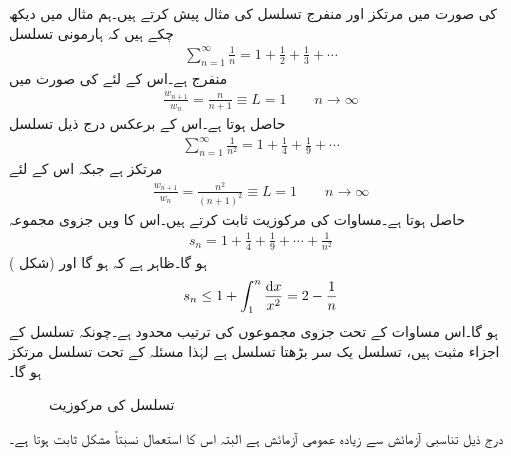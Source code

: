  کی صورت میں مرتکز اور منفرج تسلسل کی مثال پیش کرتے ہیں۔ہم مثال  میں دیکھ چکے ہیں کہ ہارمونی تسلسل 
\begin{align*}
\sum_{n=1}^{\infty} \frac{1}{n}=1+\frac{1}{2}+\frac{1}{3}+\cdots
\end{align*}
منفرج ہے۔اس کے لئے  کی صورت میں
\begin{align*}
\frac{w_{n+1}}{w_n}=\frac{n}{n+1}\equiv L=1 \quad \quad n\to \infty
\end{align*}
حاصل ہوتا ہے۔اس کے برعکس درج ذیل تسلسل
\begin{align}\label{مساوات_ترتیب_تسلسل_مربع_بالعکس}
\sum_{n=1}^{\infty}\frac{1}{n^2}=1+\frac{1}{4}+\frac{1}{9}+\cdots
\end{align}
مرتکز ہے جبکہ اس کے لئے
\begin{align*}
\frac{w_{n+1}}{w_n}=\frac{n^2}{(n+1)^2}\equiv L=1\quad \quad n\to\infty
\end{align*}
حاصل ہوتا ہے۔مساوات  کی مرکوزیت ثابت کرتے ہیں۔اس کا  ویں جزوی مجموعہ
\begin{align*}
s_n=1+\frac{1}{4}+\frac{1}{9}+\cdots+\frac{1}{n^2}
\end{align*}
ہو گا۔ظاہر ہے کہ  ہو گا  اور (شکل ) 
\begin{align*}
s_n\le 1+\int_{1}^{n}\frac{\dif x}{x^2}=2-\frac{1}{n}
\end{align*}
ہو گا۔اس مساوات کے تحت جزوی مجموعوں کی ترتیب  محدود ہے۔چونکہ تسلسل کے اجزاء مثبت ہیں، تسلسل یک سر بڑھتا  تسلسل ہے  لہٰذا مسئلہ  کے تحت تسلسل مرتکز ہو گا۔
\begin{figure}
\centering
{}
\caption{تسلسل  کی مرکوزیت}
\label{شکل_مساوات_ترتیب_تسلسل_مربع_بالعکس}
\end{figure}

درج ذیل تناسبی آزمائش سے  زیادہ عمومی آزمائش  ہے البتہ اس کا استعمال نسبتاً مشکل ثابت ہوتا ہے۔

